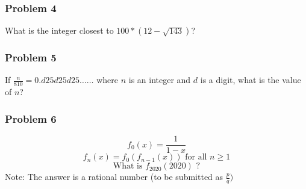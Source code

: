 \documentclass[handout]{beamer}
\begin{document}
\begin{frame}
\frametitle{Problem 4}
What is the integer closest to $100*(12 - \sqrt{143})$?
\end{frame}

\begin{frame}
\frametitle{Problem 5}
If $\frac n {810} = 0.d25d25d25 \ldots \ldots$ where $n$ is an integer and $d$ is a digit, what is the value of $n$?
\end{frame}


\begin{frame}
\frametitle{Problem 6}
$$f_0(x) = \frac 1 {1-x}$$
$$f_n(x) = f_0(f_{n-1}(x)) \mbox{ for all } n \geq 1$$
$$\mbox{What is } f_{2020}(2020) \mbox{ ?}$$
Note: The answer is a rational number (to be submitted as $\frac p q)$
\end{frame}
\end{document}
